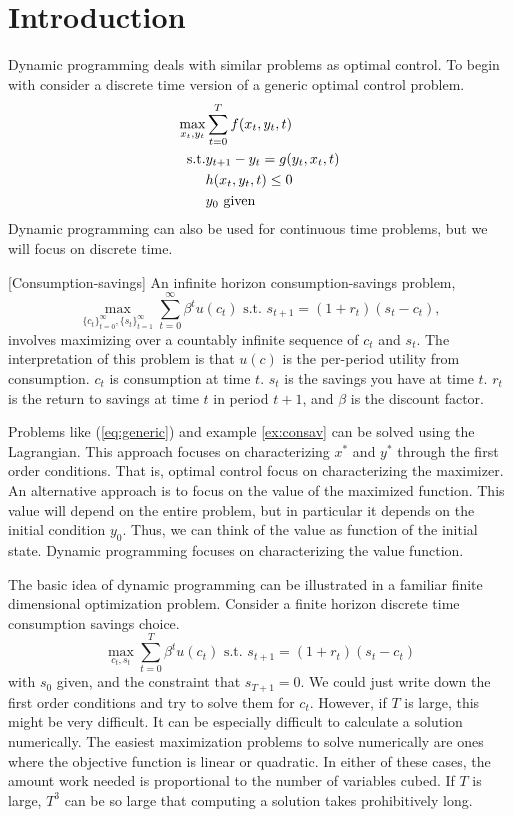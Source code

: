 \section{Introduction}

Dynamic programming deals with similar problems as optimal control. To
begin with consider a discrete time version of a generic optimal
control problem. 
\begin{align}
  \max_{x_t,y_t} & \sum_{t=0}^T f(x_t,y_t,t)  \label{eq:generic} \\
  \text{s.t.} & y_{t+1} - y_t = g(y_t,x_t,t) \notag \\
  & h(x_t,y_t,t) \leq \notag 0 \\
  & y_0 \text{ given}
\end{align}
Dynamic programming can also be used for continuous time problems, but
we will focus on discrete time. 
\begin{example}\label{ex:consav}[Consumption-savings]
  An infinite horizon consumption-savings problem, 
  \[ \max_{\{c_t\}_{t=0}^\infty,\{s_t\}_{t=1}^\infty} \sum_{t=0}^\infty
  \beta^t u(c_t) \text{ s.t. } s_{t+1} = (1+r_t)(s_t - c_t), \]  
  involves maximizing over a countably infinite sequence of $c_t$ and
  $s_t$. The interpretation of this problem is that $u(c)$ is the
  per-period utility from consumption. $c_t$ is consumption at time
  $t$. $s_t$ is the savings you have at time $t$. $r_t$ is the return to
  savings at time $t$ in period $t+1$, and $\beta$ is the discount
  factor. 
\end{example}
Problems like (\ref{eq:generic}) and example \ref{ex:consav} can be
solved using the Lagrangian. This approach focuses on characterizing
$x^*$ and $y^*$ through the first order conditions. That is, optimal
control focus on characterizing the maximizer. An alternative approach
is to focus on the value of the maximized function. This value will
depend on the entire problem, but in particular it depends on the
initial condition $y_0$. Thus, we can think of the value as function
of the initial state. Dynamic programming focuses on characterizing
the value function.

The basic idea of dynamic programming can be illustrated in a familiar
finite dimensional optimization problem. Consider a finite horizon
discrete time consumption savings choice. 
\[ \max_{c_t,s_t} \sum_{t=0}^T \beta^t u(c_t) \text{ s.t. } s_{t+1} =
(1+r_t) (s_t - c_t) \] with $s_0$ given, and the constraint that
$s_{T+1} = 0$. We could just write down the first order conditions and
try to solve them for $c_t$. However, if $T$ is large, this might be
very difficult. It can be especially difficult to calculate a solution
numerically. The easiest maximization problems to solve numerically
are ones where the objective function is linear or quadratic. In
either of these cases, the amount work needed is proportional to the
number of variables cubed. If $T$ is large, $T^3$ can be so large that
computing a solution takes prohibitively long.  

